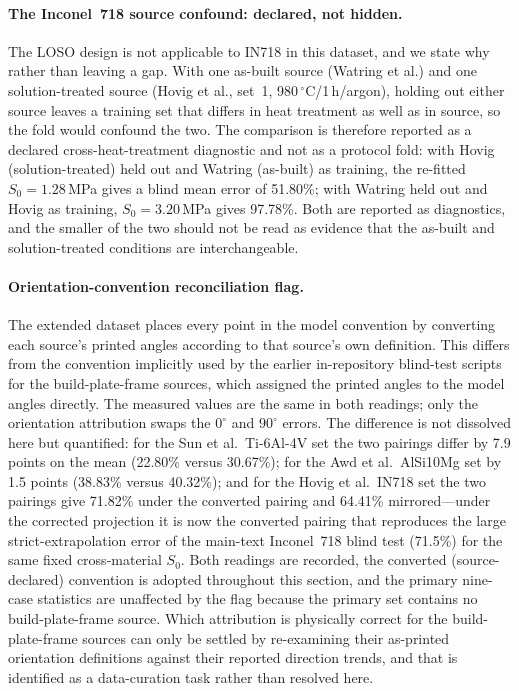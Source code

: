 \documentclass[12pt,a4paper,twocolumn]{article}
\providecommand{\ang}[1]{\ensuremath{#1^{\circ}}}
\begin{document}
\paragraph{The Inconel~718 source confound: declared, not hidden.}
The LOSO design is not applicable to IN718 in this dataset, and we state why rather than leaving a gap.
With one as-built source (Watring et al.) and one solution-treated source (Hovig et al., set~1,
980\,$^\circ$C/1\,h/argon), holding out either source leaves a training set that differs in heat treatment
as well as in source, so the fold would confound the two. The comparison is therefore reported as a
declared cross-heat-treatment diagnostic and not as a protocol fold: with Hovig (solution-treated) held
out and Watring (as-built) as training, the re-fitted $S_0 = 1.28$\,MPa gives a blind mean error of
51.80\%; with Watring held out and Hovig as training, $S_0 = 3.20$\,MPa gives 97.78\%. Both are reported
as diagnostics, and the smaller of the two should not be read as evidence that the as-built and
solution-treated conditions are interchangeable.

\paragraph{Orientation-convention reconciliation flag.}
The extended dataset places every point in the model convention by converting each source's printed
angles according to that source's own definition. This differs from the convention implicitly used by the
earlier in-repository blind-test scripts for the build-plate-frame sources, which assigned the printed
angles to the model angles directly. The measured values are the same in both readings; only the
orientation attribution swaps the $\ang{0}$ and $\ang{90}$ errors. The difference is not dissolved here
but quantified: for the Sun et al.\ Ti-6Al-4V set the two pairings differ by 7.9 points on the mean
(22.80\% versus 30.67\%); for the Awd et al.\ AlSi10Mg set by 1.5 points (38.83\% versus 40.32\%); and
for the Hovig et al.\ IN718 set the two pairings give 71.82\% under the converted pairing and 64.41\%
mirrored---under the corrected projection it is now the converted pairing that reproduces the large
strict-extrapolation error of the main-text Inconel~718 blind test (71.5\%) for the same fixed cross-material $S_0$. Both readings are recorded, the converted
(source-declared) convention is adopted throughout this section, and the primary nine-case statistics
are unaffected by the flag because the primary set contains no build-plate-frame source. Which
attribution is physically correct for the build-plate-frame sources can only be settled by re-examining
their as-printed orientation definitions against their reported direction trends, and that is identified
as a data-curation task rather than resolved here.
\end{document}
